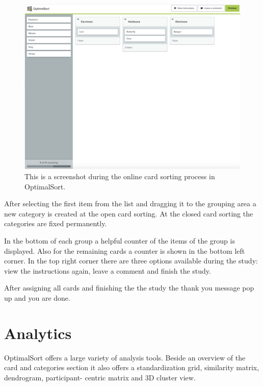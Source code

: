 \begin{figure}[tp] 
\centering
\includegraphics[keepaspectratio,width=\linewidth,height=\halfh]{images/optimalsort-sorting.png}
\caption[OptimalSort Card Sorting] { This is a screenshot during the online card
sorting process in OptimalSort.
 }
\label{fig:OptimalSort2}
\end{figure}

After selecting the first item from the list and dragging it to the grouping area a new category is 
created at the open card sorting. At the closed card sorting the categories are fixed permanently. 

In the bottom of each group a helpful counter of the items of the group is displayed. Also for the 
remaining cards a counter is shown in the bottom left corner. In the top right corner there are three 
options available during the study: view the instructions again, leave a comment and finish the 
study. 

After assigning all cards and finishing the the study the thank you message pop up and you are 
done. 


\section{Analytics}
OptimalSort offers a large variety of analysis tools. Beside an overview of the card and
categories section it also offers a standardization grid, similarity matrix, dendrogram, participant-
centric matrix and 3D cluster view. 

